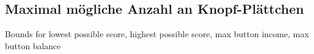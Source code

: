 
\subsection*{Maximal mögliche Anzahl an Knopf-Plättchen}


Bounds for lowest possible score, highest possible score, max button income, max button balance

